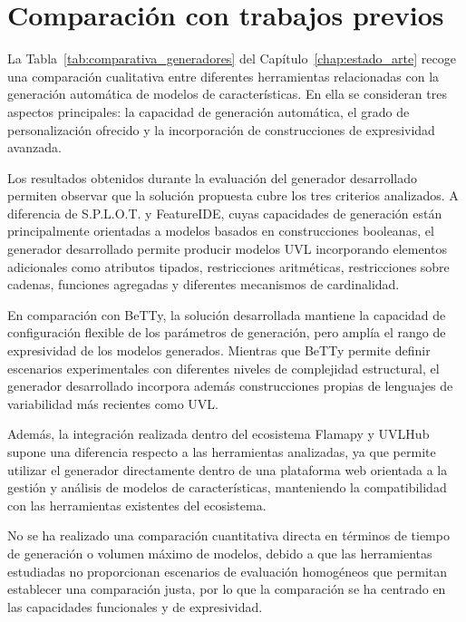 \section{Comparación con trabajos previos}
\label{sec:comparacion_trabajos}



La Tabla~\ref{tab:comparativa_generadores} del Capítulo~\ref{chap:estado_arte}
recoge una comparación cualitativa entre diferentes herramientas relacionadas
con la generación automática de modelos de características. En ella se
consideran tres aspectos principales: la capacidad de generación automática, el
grado de personalización ofrecido y la incorporación de construcciones de
expresividad avanzada.

Los resultados obtenidos durante la evaluación del generador desarrollado
permiten observar que la solución propuesta cubre los tres criterios analizados.
A diferencia de S.P.L.O.T. y FeatureIDE, cuyas capacidades de generación están
principalmente orientadas a modelos basados en construcciones booleanas,
el generador desarrollado permite producir modelos UVL incorporando elementos
adicionales como atributos tipados, restricciones aritméticas, restricciones
sobre cadenas, funciones agregadas y diferentes mecanismos de cardinalidad.

En comparación con BeTTy, la solución desarrollada mantiene la capacidad de
configuración flexible de los parámetros de generación, pero amplía el rango de
expresividad de los modelos generados. Mientras que BeTTy permite definir
escenarios experimentales con diferentes niveles de complejidad estructural, el
generador desarrollado incorpora además construcciones propias de lenguajes de
variabilidad más recientes como UVL.

Además, la integración realizada dentro del ecosistema Flamapy y UVLHub supone
una diferencia respecto a las herramientas analizadas, ya que permite utilizar
el generador directamente dentro de una plataforma web orientada a la gestión y
análisis de modelos de características, manteniendo la compatibilidad con las
herramientas existentes del ecosistema.

No se ha realizado una comparación cuantitativa directa en términos de tiempo de
generación o volumen máximo de modelos, debido a que las herramientas estudiadas
no proporcionan escenarios de evaluación homogéneos que permitan establecer una
comparación justa, por lo que la comparación se ha centrado en las
capacidades funcionales y de expresividad.

